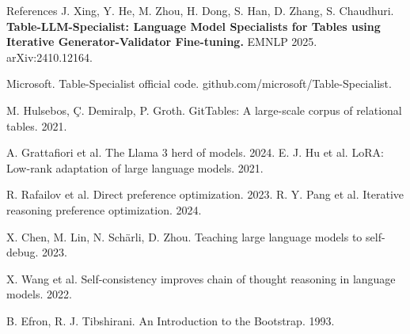 \documentclass[11pt,aspectratio=169]{beamer}
\begin{document}
\begin{frame}{References}
\footnotesize
\setlength{\parskip}{0.3em}
J. Xing, Y. He, M. Zhou, H. Dong, S. Han, D. Zhang, S. Chaudhuri. \textbf{Table-LLM-Specialist: Language Model Specialists for Tables using Iterative Generator-Validator Fine-tuning.} EMNLP 2025. arXiv:2410.12164.

Microsoft. Table-Specialist official code. github.com/microsoft/Table-Specialist.

M. Hulsebos, \c{C}. Demiralp, P. Groth. GitTables: A large-scale corpus of relational tables. 2021.

A. Grattafiori et al. The Llama 3 herd of models. 2024. \quad E. J. Hu et al. LoRA: Low-rank adaptation of large language models. 2021.

R. Rafailov et al. Direct preference optimization. 2023. \quad R. Y. Pang et al. Iterative reasoning preference optimization. 2024.

X. Chen, M. Lin, N. Sch\"arli, D. Zhou. Teaching large language models to self-debug. 2023.

X. Wang et al. Self-consistency improves chain of thought reasoning in language models. 2022.

B. Efron, R. J. Tibshirani. An Introduction to the Bootstrap. 1993.
\end{frame}
\end{document}
